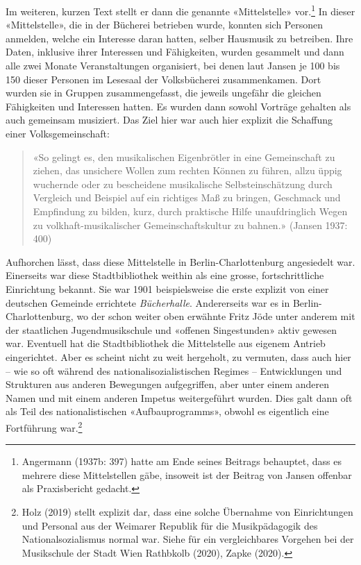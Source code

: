 \documentclass[a4paper,
fontsize=11pt,
oneside,
numbers=noperiodatend,
parskip=half-,
bibliography=totoc,
final
]{scrartcl}
\begin{document}
Im weiteren, kurzen Text stellt er dann die genannte «Mittelstelle»
vor.\footnote{Angermann (1937b: 397) hatte am Ende seines Beitrags
  behauptet, dass es mehrere diese Mittelstellen gäbe, insoweit ist der
  Beitrag von Jansen offenbar als Praxisbericht gedacht.} In dieser
«Mittelstelle», die in der Bücherei betrieben wurde, konnten sich
Personen anmelden, welche ein Interesse daran hatten, selber Hausmusik
zu betreiben. Ihre Daten, inklusive ihrer Interessen und Fähigkeiten,
wurden gesammelt und dann alle zwei Monate Veranstaltungen organisiert,
bei denen laut Jansen je 100 bis 150 dieser Personen im Lesesaal der
Volksbücherei zusammenkamen. Dort wurden sie in Gruppen zusammengefasst,
die jeweils ungefähr die gleichen Fähigkeiten und Interessen hatten. Es
wurden dann sowohl Vorträge gehalten als auch gemeinsam musiziert. Das
Ziel hier war auch hier explizit die Schaffung einer Volksgemeinschaft:

\begin{quote}
«So gelingt es, den musikalischen Eigenbrötler in eine Gemeinschaft zu
ziehen, das unsichere Wollen zum rechten Können zu führen, allzu üppig
wuchernde oder zu bescheidene musikalische Selbsteinschätzung durch
Vergleich und Beispiel auf ein richtiges Maß zu bringen, Geschmack und
Empfindung zu bilden, kurz, durch praktische Hilfe unaufdringlich Wegen
zu volkhaft-musikalischer Gemeinschaftskultur zu bahnen.» (Jansen 1937:
400)
\end{quote}

Aufhorchen lässt, dass diese Mittelstelle in Berlin-Charlottenburg
angesiedelt war. Einerseits war diese Stadtbibliothek weithin als eine
grosse, fortschrittliche Einrichtung bekannt. Sie war 1901
beispielsweise die erste explizit von einer deutschen Gemeinde
errichtete \emph{Bücherhalle}. Andererseits war es in
Berlin-Charlottenburg, wo der schon weiter oben erwähnte Fritz Jöde
unter anderem mit der staatlichen Jugendmusikschule und «offenen
Singestunden» aktiv gewesen war. Eventuell hat die Stadtbibliothek die
Mittelstelle aus eigenem Antrieb eingerichtet. Aber es scheint nicht zu
weit hergeholt, zu vermuten, dass auch hier -- wie so oft während des
nationalisozialistischen Regimes -- Entwicklungen und Strukturen aus
anderen Bewegungen aufgegriffen, aber unter einem anderen Namen und mit
einem anderen Impetus weitergeführt wurden. Dies galt dann oft als Teil
des nationalistischen «Aufbauprogramms», obwohl es eigentlich eine
Fortführung war.\footnote{Holz (2019) stellt explizit dar, dass eine
  solche Übernahme von Einrichtungen und Personal aus der Weimarer
  Republik für die Musikpädagogik des Nationalsozialismus normal war.
  Siehe für ein vergleichbares Vorgehen bei der Musikschule der Stadt
  Wien Rathbkolb (2020), Zapke (2020).}
\end{document}
